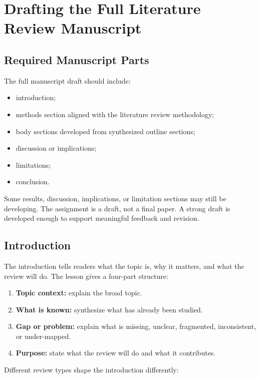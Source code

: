 \documentclass[10pt,letterpaper]{article}
\begin{document}
\section{Drafting the Full Literature Review Manuscript}

\subsection{Required Manuscript Parts}

The full manuscript draft should include:

\begin{itemize}
\item introduction;
\item methods section aligned with the literature review methodology;
\item body sections developed from synthesized outline sections;
\item discussion or implications;
\item limitations;
\item conclusion.
\end{itemize}

Some results, discussion, implications, or limitation sections may still be developing. The assignment is a draft, not a final paper. A strong draft is developed enough to support meaningful feedback and revision.

\subsection{Introduction}

The introduction tells readers what the topic is, why it matters, and what the review will do. The lesson gives a four-part structure:

\begin{enumerate}
\item \textbf{Topic context:} explain the broad topic.
\item \textbf{What is known:} synthesize what has already been studied.
\item \textbf{Gap or problem:} explain what is missing, unclear, fragmented, inconsistent, or under-mapped.
\item \textbf{Purpose:} state what the review will do and what it contributes.
\end{enumerate}

Different review types shape the introduction differently:
\end{document}
